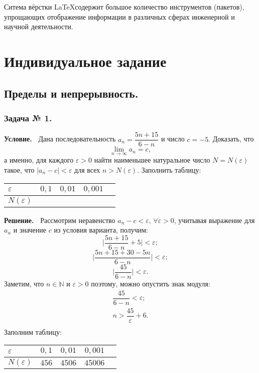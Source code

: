 \documentclass[12pt]{article}
\newcommand{\eps}{\varepsilon}
\begin{document}
Ситема вёрстки \LaTeX содержит большое количество инструментов (пакетов), упрощающих отображение информации в различных 
сферах инженерной и научной деятельности. 

\newpage
\section{Индивидуальное задание}
\subsection{Пределы и непрерывность.}
\subsubsection*{\center Задача № 1.}
{\bf Условие.~}
Дана последовательность $a_{n}=\dfrac{5n+15}{6-n}$ и число $c=-5$.
Доказать, что $$\lim\limits_{n\rightarrow\infty}a_n=c,$$
а именно, для каждого $\eps>0$ найти наименьшее натуральное число $N{=}N(\eps)$ такое, что $|a_{n}-c|<\eps$ для всех $n>N(\eps)$.
Заполнить таблицу:
\begin{center}
\begin{tabular}{ | p{25pt} | c | c | c | c |}
\hline
$\varepsilon$& $0{,}1$ & $0{,}01$ & $0{,}001$ \\
\hline
$N(\varepsilon)$ &   &   &\\
\hline
\end{tabular}    
\end{center}
{\bf Решение.~}
Рассмотрим неравенство $a_n-c<\eps,\,\forall\eps>0$, учитывая выражение для $a_n$ и значение $c$ из условия варианта,
получим:
$$
\biggl|\dfrac{5n+15}{6-n}+5\biggr| < \eps ;
$$
$$
\biggl|\frac{5n+15+30-5n}{6-n}\biggr| < \eps ;
$$
$$
\biggl|\frac{45}{6-n}\biggr| < \eps .
$$
Заметим, что $n\in\mathbb{N}$ и $\eps >0$ поэтому, можно опустить знак модуля:
$$
\begin{array}{c}
\dfrac{45}{6-n} < \eps ;                         \\[8pt]
n > \dfrac{45}{\eps} + 6 .                       \\[8pt]
\end{array}
$$
\center Заполним таблицу:
\begin{center}
\begin{tabular}{ | p{25pt} | c | c | c | c |}
\hline
$\varepsilon$& $0{,}1$ & $0{,}01$ & $0{,}001$ \\
\hline
$N(\varepsilon)$& $456$ & $4506$ & $45006$\\
\hline
\end{tabular}
\end{center} 
\end{document}
